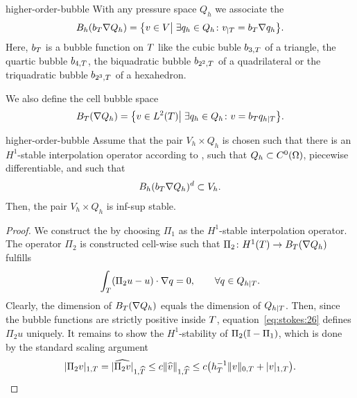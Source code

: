 \begin{Definition}{higher-order-bubble}
  With any pressure space $Q_h$ we associate the 
  \begin{gather}
    \label{eq:stokes:24}
    B_h(b_T \nabla Q_h)
    = \bigl\{ v\in V \big\vert
    \; \exists q_h\in Q_h \colon v_{|T} = b_T \nabla q_h \bigr\}.
  \end{gather}
  Here, $b_T$ is a bubble function on $T$ like the cubic buble
  $b_{3,T}$ of a triangle, the quartic bubble $b_{4,T}$, the
  biquadratic bubble $b_{2^2,T}$ of a quadrilateral or the
  triquadratic bubble $b_{2^3,T}$ of a hexahedron.

  We also define the cell bubble space
  \begin{gather}
    \label{eq:stokes:25}
    B_T(\nabla Q_h) = \bigl\{ v\in L^2(T) \big\vert
    \;\exists q_h\in Q_h \colon v = b_T q_{h|T}\bigr\}.
  \end{gather}
\end{Definition}

\begin{Theorem}{higher-order-bubble}
  Assume that the pair $V_h\times Q_h$ is chosen such that there is
  an $H^1$-stable interpolation operator according to
  , such that $Q_h\subset
  C^0(\Omega)$, piecewise differentiable, and such that
  \begin{gather}
    B_h(b_T \nabla Q_h)^d \subset V_h.
  \end{gather}
  Then, the pair $V_h\times Q_h$ is inf-sup stable.
\end{Theorem}

\begin{proof}
  We construct the  by
   choosing $\Pi_1$ as the
  $H^1$-stable interpolation operator. The operator $\Pi_2$ is
  constructed cell-wise such that $\Pi_2\colon H^1(T) \to
  B_T(\nabla Q_h)$ fulfills
  \begin{gather}
    \label{eq:stokes:26}
    \int_T (\Pi_2 u - u) \cdot\nabla q = 0,
    \qquad
    \forall q\in Q_{h|T}.
  \end{gather}
  Clearly, the dimension of $B_T(\nabla Q_h)$ equals the dimension
  of $Q_{h|T}$. Then, since the bubble functions are strictly
  positive inside $T$, equation~\eqref{eq:stokes:26} defines
  $\Pi_2 u$ uniquely. It remains to show the $H^1$-stability of
  $\Pi_2(\mathbb I-\Pi_1)$, which is done by the standard scaling
  argument
  \begin{gather*}
    \lvert\Pi_2 v\rvert_{1,T}
    =\lvert\widehat{\Pi_2 v}\rvert_{1,\widehat{T}}
    \le c \lVert\widehat v\rVert_{1,\widehat{T}}
    \le c \bigl(h_T^{-1} \lVert v\rVert_{0,T} + \lvert v\rvert_{1,T}\bigr).
  \end{gather*}
\end{proof}

